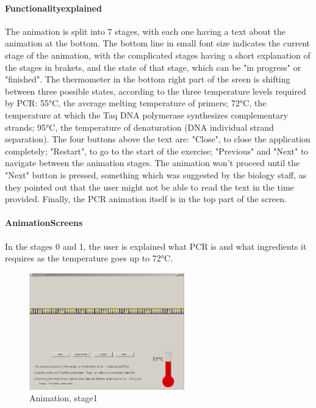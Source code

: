 \paragraph{Functionalityexplained}
The animation is split into 7 stages, with each one having a text about the animation at the bottom. The bottom line in small font size indicates the current stage of the animation, with the complicated stages having a short explanation of the stages in brakets, and the state of that stage, which can be "in progress" or "finished". The thermometer in the bottom right part of the sreen is shifting between three possible states, according to the three temperature levels required by PCR: 55°C, the average melting temperature of primers; 72°C, the temperature at which the Taq DNA polymerase synthesizes complementary strands; 95°C, the temperature of denaturation (DNA individual strand separation). The four buttons above the text are: "Close", to close the application completely; "Restart", to go to the start of the exercise; "Previous" and "Next" to navigate between the animation stages. The animation won't proceed until the "Next" button is pressed, something which was suggested by the biology staff, as they pointed out that the user might not be able to read the text in the time provided. Finally, the PCR animation itself is in the top part of the screen.

\paragraph{AnimationScreens}

In the stages 0 and 1, the user is explained what PCR is and what ingredients it requires as the temperature goes up to 72°C.

\begin{figure}[h]
  \begin{center}
	\includegraphics[width=0.6\textwidth]{./images/AnimImpl/Stage1}
    \caption{
      \label{fig:AnimImpl:stage1}
      Animation, stage1
    }
  \end{center}
\end{figure}


